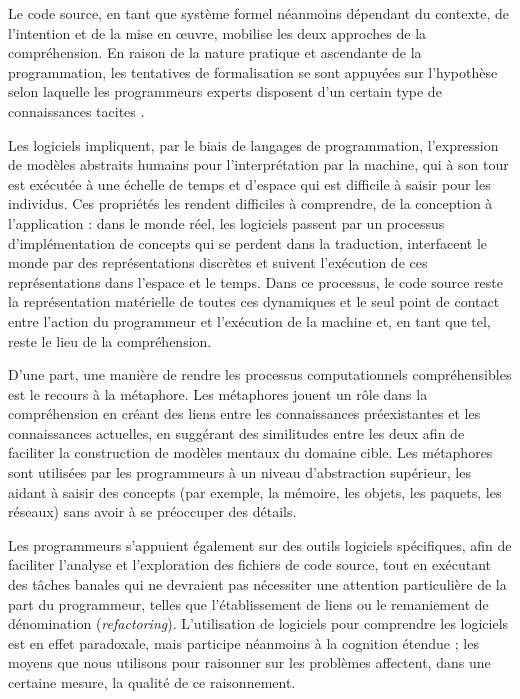 \documentclass{article}
\begin{document}
Le code source, en tant que système formel néanmoins dépendant du contexte, de l'intention et de la mise en œuvre, mobilise les deux approches de la compréhension. En raison de la nature pratique et ascendante de la programmation, les tentatives de formalisation se sont appuyées sur l'hypothèse selon laquelle les programmeurs experts disposent d'un certain type de connaissances tacites \citep{soloway1982tapping,soloway_empirical_1984}.

Les logiciels impliquent, par le biais de langages de programmation, l'expression de modèles abstraits humains pour l'interprétation par la machine, qui à son tour est exécutée à une échelle de temps et d'espace qui est difficile à saisir pour les individus. Ces propriétés les rendent difficiles à comprendre, de la conception à l'application : dans le monde réel, les logiciels passent par un processus d'implémentation de concepts qui se perdent dans la traduction, interfacent le monde par des représentations discrètes et suivent l'exécution de ces représentations dans l'espace et le temps. Dans ce processus, le code source reste la représentation matérielle de toutes ces dynamiques et le seul point de contact entre l'action du programmeur et l'exécution de la machine et, en tant que tel, reste le lieu de la compréhension.

D'une part, une manière de rendre les processus computationnels compréhensibles est le recours à la métaphore. Les métaphores jouent un rôle dans la compréhension en créant des liens entre les connaissances préexistantes et les connaissances actuelles, en suggérant des similitudes entre les deux afin de faciliter la construction de modèles mentaux du domaine cible. Les métaphores sont utilisées par les programmeurs à un niveau d'abstraction supérieur, les aidant à saisir des concepts (par exemple, la mémoire, les objets, les paquets, les réseaux) sans avoir à se préoccuper des détails. 

Les programmeurs s'appuient également sur des outils logiciels spécifiques, afin de faciliter l'analyse et l'exploration des fichiers de code source, tout en exécutant des tâches banales qui ne devraient pas nécessiter une attention particulière de la part du programmeur, telles que l'établissement de liens ou le remaniement de dénomination (\emph{refactoring}). L'utilisation de logiciels pour comprendre les logiciels est en effet paradoxale, mais participe néanmoins à la cognition étendue ; les moyens que nous utilisons pour raisonner sur les problèmes affectent, dans une certaine mesure, la qualité de ce raisonnement.
\end{document}
